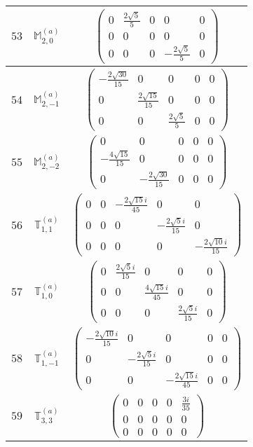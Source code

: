 \documentclass[fleqn,8pt,landscape]{jsarticle}
\begin{document}
\begin{center}
\begin{longtable}{ccc}
$ 53 $ & $ \mathbb{M}_{2,0}^{(a)} $ & $ \begin{pmatrix} 0 & \frac{2 \sqrt{5}}{5} & 0 & 0 & 0 \\ 0 & 0 & 0 & 0 & 0 \\ 0 & 0 & 0 & - \frac{2 \sqrt{5}}{5} & 0 \end{pmatrix} $ \\ \hline
$ 54 $ & $ \mathbb{M}_{2,-1}^{(a)} $ & $ \begin{pmatrix} - \frac{2 \sqrt{30}}{15} & 0 & 0 & 0 & 0 \\ 0 & \frac{2 \sqrt{15}}{15} & 0 & 0 & 0 \\ 0 & 0 & \frac{2 \sqrt{5}}{5} & 0 & 0 \end{pmatrix} $ \\ \hline
$ 55 $ & $ \mathbb{M}_{2,-2}^{(a)} $ & $ \begin{pmatrix} 0 & 0 & 0 & 0 & 0 \\ - \frac{4 \sqrt{15}}{15} & 0 & 0 & 0 & 0 \\ 0 & - \frac{2 \sqrt{30}}{15} & 0 & 0 & 0 \end{pmatrix} $ \\ \hline
$ 56 $ & $ \mathbb{T}_{1,1}^{(a)} $ & $ \begin{pmatrix} 0 & 0 & - \frac{2 \sqrt{15} i}{45} & 0 & 0 \\ 0 & 0 & 0 & - \frac{2 \sqrt{5} i}{15} & 0 \\ 0 & 0 & 0 & 0 & - \frac{2 \sqrt{10} i}{15} \end{pmatrix} $ \\ \hline
$ 57 $ & $ \mathbb{T}_{1,0}^{(a)} $ & $ \begin{pmatrix} 0 & \frac{2 \sqrt{5} i}{15} & 0 & 0 & 0 \\ 0 & 0 & \frac{4 \sqrt{15} i}{45} & 0 & 0 \\ 0 & 0 & 0 & \frac{2 \sqrt{5} i}{15} & 0 \end{pmatrix} $ \\ \hline
$ 58 $ & $ \mathbb{T}_{1,-1}^{(a)} $ & $ \begin{pmatrix} - \frac{2 \sqrt{10} i}{15} & 0 & 0 & 0 & 0 \\ 0 & - \frac{2 \sqrt{5} i}{15} & 0 & 0 & 0 \\ 0 & 0 & - \frac{2 \sqrt{15} i}{45} & 0 & 0 \end{pmatrix} $ \\ \hline
$ 59 $ & $ \mathbb{T}_{3,3}^{(a)} $ & $ \begin{pmatrix} 0 & 0 & 0 & 0 & \frac{3 i}{35} \\ 0 & 0 & 0 & 0 & 0 \\ 0 & 0 & 0 & 0 & 0 \end{pmatrix} $ \\ \hline

\end{longtable}
\end{center}
\end{document}

